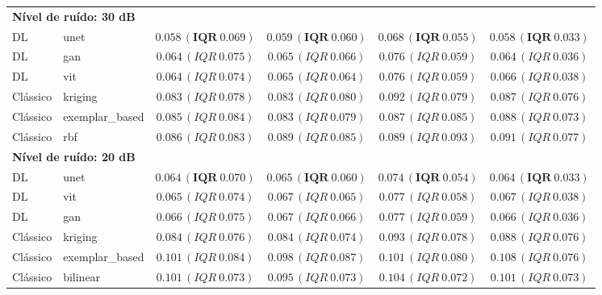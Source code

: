\begin{table}[htbp]
{\begin{tabular}{llcccc}
\midrule
\multicolumn{6}{l}{\textbf{Nível de ruído: 30 dB}} \\
DL & unet & $\mathbf{0.058\,(IQR\ 0.069)}$ & $\mathbf{0.059\,(IQR\ 0.060)}$ & $\mathbf{0.068\,(IQR\ 0.055)}$ & $\mathbf{0.058\,(IQR\ 0.033)}$ \\
DL & gan & \underline{$0.064\,(IQR\ 0.075)$} & \underline{$0.065\,(IQR\ 0.066)$} & \underline{$0.076\,(IQR\ 0.059)$} & \underline{$0.064\,(IQR\ 0.036)$} \\
DL & vit & \textit{$0.064\,(IQR\ 0.074)$} & \textit{$0.065\,(IQR\ 0.064)$} & \textit{$0.076\,(IQR\ 0.059)$} & \textit{$0.066\,(IQR\ 0.038)$} \\
Clássico & kriging & $0.083\,(IQR\ 0.078)$ & $0.083\,(IQR\ 0.080)$ & $0.092\,(IQR\ 0.079)$ & $0.087\,(IQR\ 0.076)$ \\
Clássico & exemplar\_based & $0.085\,(IQR\ 0.084)$ & $0.083\,(IQR\ 0.079)$ & $0.087\,(IQR\ 0.085)$ & $0.088\,(IQR\ 0.073)$ \\
Clássico & rbf & $0.086\,(IQR\ 0.083)$ & $0.089\,(IQR\ 0.085)$ & $0.089\,(IQR\ 0.093)$ & $0.091\,(IQR\ 0.077)$ \\
\midrule
\multicolumn{6}{l}{\textbf{Nível de ruído: 20 dB}} \\
DL & unet & $\mathbf{0.064\,(IQR\ 0.070)}$ & $\mathbf{0.065\,(IQR\ 0.060)}$ & $\mathbf{0.074\,(IQR\ 0.054)}$ & $\mathbf{0.064\,(IQR\ 0.033)}$ \\
DL & vit & \underline{$0.065\,(IQR\ 0.074)$} & \textit{$0.067\,(IQR\ 0.065)$} & \underline{$0.077\,(IQR\ 0.058)$} & \textit{$0.067\,(IQR\ 0.038)$} \\
DL & gan & \textit{$0.066\,(IQR\ 0.075)$} & \underline{$0.067\,(IQR\ 0.066)$} & \textit{$0.077\,(IQR\ 0.059)$} & \underline{$0.066\,(IQR\ 0.036)$} \\
Clássico & kriging & $0.084\,(IQR\ 0.076)$ & $0.084\,(IQR\ 0.074)$ & $0.093\,(IQR\ 0.078)$ & $0.088\,(IQR\ 0.076)$ \\
Clássico & exemplar\_based & $0.101\,(IQR\ 0.084)$ & $0.098\,(IQR\ 0.087)$ & $0.101\,(IQR\ 0.080)$ & $0.108\,(IQR\ 0.076)$ \\
Clássico & bilinear & $0.101\,(IQR\ 0.073)$ & $0.095\,(IQR\ 0.073)$ & $0.104\,(IQR\ 0.072)$ & $0.101\,(IQR\ 0.073)$ \\
\bottomrule
\end{tabular}
}
\end{table}
